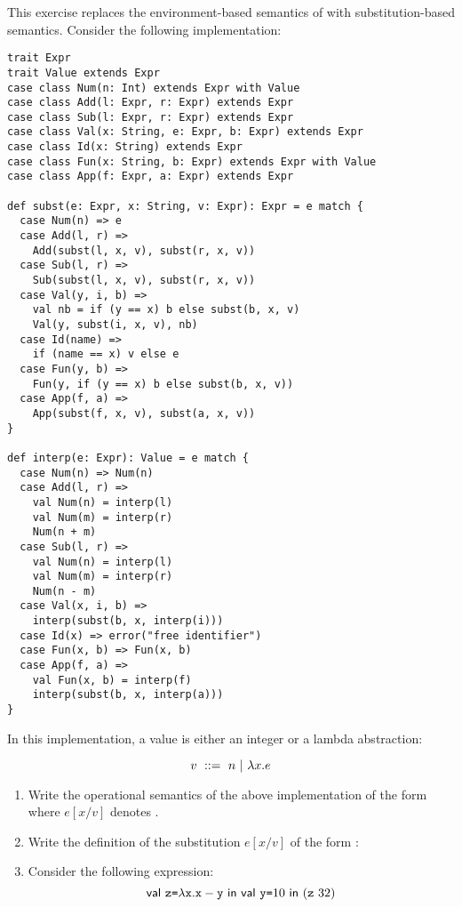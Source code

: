 \begin{exercise}

This exercise replaces the environment-based semantics of \lang with
substitution-based semantics.
Consider the following implementation:
\begin{verbatim}
trait Expr
trait Value extends Expr
case class Num(n: Int) extends Expr with Value
case class Add(l: Expr, r: Expr) extends Expr
case class Sub(l: Expr, r: Expr) extends Expr
case class Val(x: String, e: Expr, b: Expr) extends Expr
case class Id(x: String) extends Expr
case class Fun(x: String, b: Expr) extends Expr with Value
case class App(f: Expr, a: Expr) extends Expr

def subst(e: Expr, x: String, v: Expr): Expr = e match {
  case Num(n) => e
  case Add(l, r) =>
    Add(subst(l, x, v), subst(r, x, v))
  case Sub(l, r) =>
    Sub(subst(l, x, v), subst(r, x, v))
  case Val(y, i, b) =>
    val nb = if (y == x) b else subst(b, x, v)
    Val(y, subst(i, x, v), nb)
  case Id(name) =>
    if (name == x) v else e
  case Fun(y, b) =>
    Fun(y, if (y == x) b else subst(b, x, v))
  case App(f, a) =>
    App(subst(f, x, v), subst(a, x, v))
}

def interp(e: Expr): Value = e match {
  case Num(n) => Num(n)
  case Add(l, r) =>
    val Num(n) = interp(l)
    val Num(m) = interp(r)
    Num(n + m)
  case Sub(l, r) =>
    val Num(n) = interp(l)
    val Num(m) = interp(r)
    Num(n - m)
  case Val(x, i, b) =>
    interp(subst(b, x, interp(i)))
  case Id(x) => error("free identifier")
  case Fun(x, b) => Fun(x, b)
  case App(f, a) =>
    val Fun(x, b) = interp(f)
    interp(subst(b, x, interp(a)))
}
\end{verbatim}

In this implementation, a value is either an integer or a lambda abstraction:

\[ v\ ::=\ n\ |\ \lambda x.e \]

\begin{enumerate}
  \item
    Write the operational semantics of the above implementation
    of the form 
    where $e[x/v]$ denotes .

  \item Write the definition of the substitution $e[x/v]$
    of the form :

  \item Consider the following expression:
\[
\ebind{\code{z}}{\efun{\cx}{\esub{\cx}{\cy}}}{
    \ebind{\cy}{10}{
        (\eapp{\code{z}}{32})
    }
}
\]


\end{enumerate}
\end{exercise}
